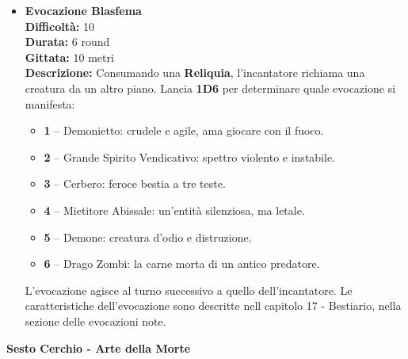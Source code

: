 \documentclass[./magie.tex]{subfiles}
\begin{document}
\begin{itemize}
\vspace{0.5cm}\rule{\textwidth}{0.4pt}\vspace{1cm}

\item \textbf{Evocazione Blasfema} \\
\textbf{Difficoltà:} 10 \\
\textbf{Durata:} 6 round \\
\textbf{Gittata:} 10 metri \\
\textbf{Descrizione:} Consumando una \textbf{Reliquia}, l’incantatore richiama una creatura da un altro piano. Lancia \textbf{1D6} per determinare quale evocazione si manifesta:
\begin{itemize}
\item \textbf{1} – Demonietto: crudele e agile, ama giocare con il fuoco.
\item \textbf{2} – Grande Spirito Vendicativo: spettro violento e instabile.
\item \textbf{3} – Cerbero: feroce bestia a tre teste.
\item \textbf{4} – Mietitore Abissale: un'entità silenziosa, ma letale.
\item \textbf{5} – Demone: creatura d’odio e distruzione.
\item \textbf{6} – Drago Zombi: la carne morta di un antico predatore.
\end{itemize}
L'evocazione agisce al turno successivo a quello dell'incantatore. Le caratteristiche dell'evocazione sono descritte nell capitolo 17 - Bestiario, nella sezione delle evocazioni note.
\end{itemize}


\clearpage
\vspace{0.2cm}
{\zarafirtitlefont\Large\bfseries Sesto Cerchio - Arte della Morte}
\end{document}
